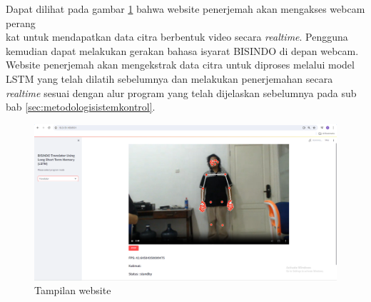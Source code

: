 Dapat dilihat pada gambar \ref{fig:tampilanwebsite} bahwa website penerjemah akan mengakses webcam perang\\kat untuk mendapatkan data citra berbentuk video secara \emph{realtime}. Pengguna kemudian dapat melakukan gerakan bahasa isyarat BISINDO di depan webcam. Website penerjemah akan mengekstrak data citra untuk diproses melalui model LSTM yang telah dilatih sebelumnya dan melakukan penerjemahan secara \emph{realtime} sesuai dengan alur program yang telah dijelaskan sebelumnya pada sub bab \ref{sec:metodologisistemkontrol}. 

\begin{figure}[H]
  \centering

  \includegraphics[scale=0.25]{gambar/bab3-layoutweb.png}

  \caption{Tampilan website}
  \label{fig:tampilanwebsite}
\end{figure}




